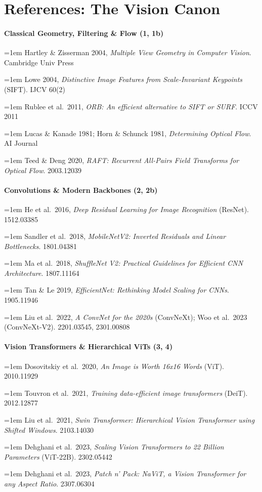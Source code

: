 \section{References: The Vision Canon}\label{sec:refs}
{\small\raggedright
\newcommand{\rf}[2]{\par\noindent\hangindent=1em\hangafter=1 #1 {\color{mute}\ttfamily\scriptsize #2}\par}

\paragraph{Classical Geometry, Filtering \& Flow (1, 1b)}
\rf{Hartley \& Zisserman 2004, \emph{Multiple View Geometry in Computer Vision}.}{Cambridge Univ Press}
\rf{Lowe 2004, \emph{Distinctive Image Features from Scale-Invariant Keypoints} (SIFT).}{IJCV 60(2)}
\rf{Rublee et al.\ 2011, \emph{ORB: An efficient alternative to SIFT or SURF}.}{ICCV 2011}
\rf{Lucas \& Kanade 1981; Horn \& Schunck 1981, \emph{Determining Optical Flow}.}{AI Journal}
\rf{Teed \& Deng 2020, \emph{RAFT: Recurrent All-Pairs Field Transforms for Optical Flow}.}{2003.12039}

\paragraph{Convolutions \& Modern Backbones (2, 2b)}
\rf{He et al.\ 2016, \emph{Deep Residual Learning for Image Recognition} (ResNet).}{1512.03385}
\rf{Sandler et al.\ 2018, \emph{MobileNetV2: Inverted Residuals and Linear Bottlenecks}.}{1801.04381}
\rf{Ma et al.\ 2018, \emph{ShuffleNet V2: Practical Guidelines for Efficient CNN Architecture}.}{1807.11164}
\rf{Tan \& Le 2019, \emph{EfficientNet: Rethinking Model Scaling for CNNs}.}{1905.11946}
\rf{Liu et al.\ 2022, \emph{A ConvNet for the 2020s} (ConvNeXt); Woo et al.\ 2023 (ConvNeXt-V2).}{2201.03545, 2301.00808}

\paragraph{Vision Transformers \& Hierarchical ViTs (3, 4)}
\rf{Dosovitskiy et al.\ 2020, \emph{An Image is Worth 16x16 Words} (ViT).}{2010.11929}
\rf{Touvron et al.\ 2021, \emph{Training data-efficient image transformers} (DeiT).}{2012.12877}
\rf{Liu et al.\ 2021, \emph{Swin Transformer: Hierarchical Vision Transformer using Shifted Windows}.}{2103.14030}
\rf{Dehghani et al.\ 2023, \emph{Scaling Vision Transformers to 22 Billion Parameters} (ViT-22B).}{2302.05442}
\rf{Dehghani et al.\ 2023, \emph{Patch n' Pack: NaViT, a Vision Transformer for any Aspect Ratio}.}{2307.06304}

}
